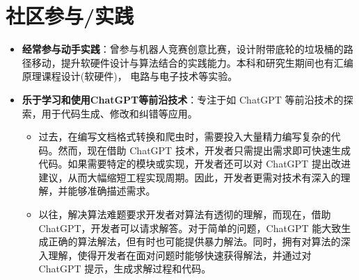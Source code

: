 \documentclass{resume}
\begin{document}
\section{社区参与/实践}
\begin{itemize}[parsep=0.2ex]  
  \item \textbf{经常参与动手实践}：曾参与机器人竞赛创意比赛，设计附带底轮的垃圾桶的路径移动，提升软硬件设计与算法结合的实践能力。本科和研究生期间也有汇编原理课程设计(软硬件)， 电路与电子技术等实验。
  \item \textbf{乐于学习和使用ChatGPT等前沿技术}：专注于如 ChatGPT 等前沿技术的探索，用于代码生成、修改和纠错等应用。
  \begin{itemize}
	\item 过去，在编写文档格式转换和爬虫时，需要投入大量精力编写复杂的代码。然而，现在借助 ChatGPT 技术，开发者只需提出需求即可快速生成代码。如果需要特定的模块或实现，开发者还可以对 ChatGPT 提出改进建议，从而大幅缩短工程实现周期。因此，开发者更需对技术有深入的理解，并能够准确描述需求。
	\item 以往，解决算法难题要求开发者对算法有透彻的理解，而现在，借助 ChatGPT，开发者可以请求解答。对于简单的问题，ChatGPT 能大致生成正确的算法解法，但有时也可能提供暴力解法。同时，拥有对算法的深入理解，使得开发者在面对问题时能够快速获得解法，并通过对 ChatGPT 提示，生成求解过程和代码。
  \end{itemize}
  
\end{itemize}

%
%
\end{document}
